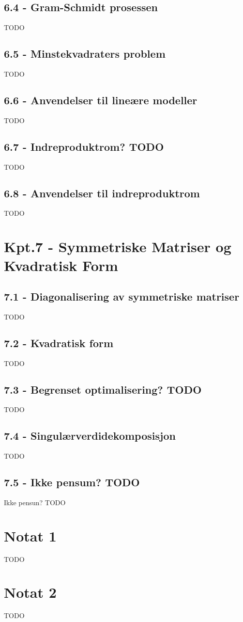 \documentclass{article}
\begin{document}
    \subsection{6.4 - Gram-Schmidt prosessen}
      TODO
    \subsection{6.5 - Minstekvadraters problem}
      TODO
    \subsection{6.6 - Anvendelser til lineære modeller}
      TODO
    \subsection{6.7 - Indreproduktrom? TODO}
      TODO
    \subsection{6.8 - Anvendelser til indreproduktrom}
      TODO
  \section{Kpt.7 - Symmetriske Matriser og Kvadratisk Form}
    \subsection{7.1 - Diagonalisering av symmetriske matriser}
      TODO
    \subsection{7.2 - Kvadratisk form}
      TODO
    \subsection{7.3 - Begrenset optimalisering? TODO}
      TODO
    \subsection{7.4 - Singulærverdidekomposisjon}
      TODO
    \subsection{7.5 - Ikke pensum? TODO}
      Ikke pensun? TODO
  \section{Notat 1}
    TODO
  \section{Notat 2}
    TODO
\end{document}

